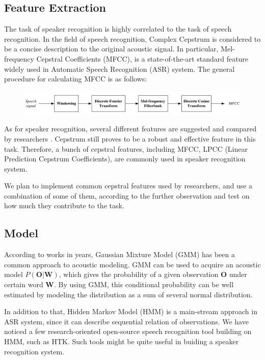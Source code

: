 \documentclass{article}
\begin{document}
\subsection{Feature Extraction}
The task of speaker recognition is highly correlated to the task of speech recognition.
In the field of speech recognition, Complex Cepstrum \cite{cepstrum} is
considered to be a concise description to the original acoustic signal.
In particular, Mel-frequency Cepstral Coefficients (MFCC), is a state-of-the-art standard feature
widely used in Automatic Speech Recognition (ASR) system.
The general procedure for calculating MFCC is as follows:
\begin{figure}[H]
  \centering
  \includegraphics[width=\textwidth]{res/MFCC.png}
\end{figure}

As for speaker recognition, several different features are suggested and compared
by researchers \cite{evaluation}. Cepstrum still proves to be a robust and effective
feature in this task. Therefore, a bunch of cepstral features, including MFCC,
LPCC (Linear Prediction Cepstrum Coefficients), are commonly used
in speaker recognition system.\cite{feature}

We plan to implement common cepstral features used by researchers, and use a
combination of some of them, according to the further observation and test on how
much they contribute to the task.

\subsection{Model}
According to works in years, Gaussian Mixture Model (GMM)
has been a common approach to acoustic modeling.\cite{GMM}
GMM can be used to acquire an acoustic model $P(\mathbf{O} | \mathbf{W}) $,
which gives the probability of a given observation
$\mathbf{O}$ under certain word $\mathbf{W}$. By using GMM, this
conditional probability can be well estimated by modeling the distribution as
a sum of several normal distribution.

In addition to that, Hidden Markov Model (HMM) is a main-stream approach in ASR system,
since it can describe sequential relation of observations.\cite{SLP}
We have noticed a few research-oriented open-source speech recognition
tool building on HMM, such as HTK\cite{htk}.
Such tools might be quite useful in buiding a speaker recognition system.
\end{document}
